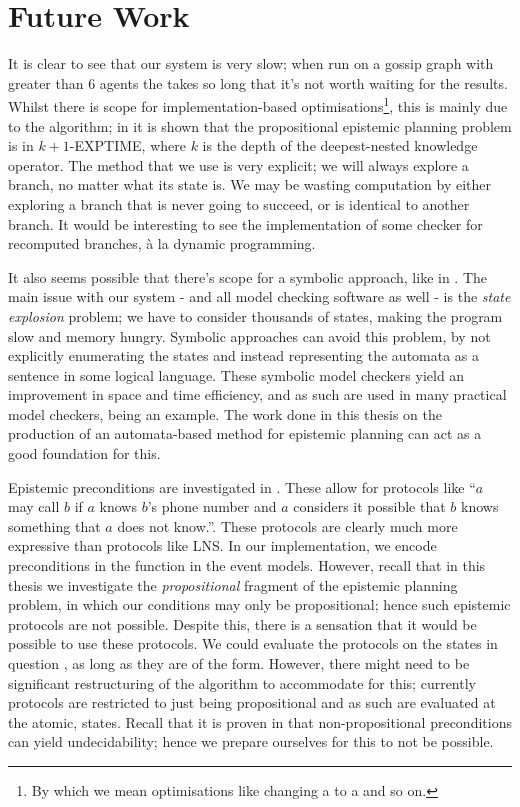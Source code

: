 \documentclass[10pt, a4paper]{report}
\begin{document}
\section{Future Work}

It is clear to see that our system is very slow; when run on a gossip graph with
greater than 6 agents the takes so long that it's not worth waiting for the
results. Whilst there is scope for implementation-based
optimisations\footnote{By which we mean optimisations like changing a 
  to a  and so on.}, this is mainly due to the algorithm; in
\cite{AutomataTechniques} it is shown that the propositional epistemic planning
problem is in \textsf{$k + 1$-EXPTIME}, where $k$ is the depth of the
deepest-nested knowledge operator. The method that we use is very explicit; we
will always explore a branch, no matter what its state is. We may be wasting
computation by either exploring a branch that is never going to succeed, or is
identical to another branch. It would be interesting to see the implementation
of some checker for recomputed branches, \`{a} la dynamic programming.

It also seems possible that there's scope for a symbolic approach, like in
\cite{MalvinThesis}. The main issue with our system - and all model checking
software as well - is the \emph{state explosion} problem; we have to consider
thousands of states, making the program slow and memory hungry. Symbolic
approaches can avoid this problem, by not explicitly enumerating the states and
instead representing the automata as a sentence in some logical language. These
symbolic model checkers yield an improvement in space and time efficiency, and
as such are used in many practical model checkers, \cite{SMCDEL} being an
example. The work done in this thesis on the production of an automata-based
method for epistemic planning can act as a good foundation for this.


Epistemic preconditions are investigated in \cite{EpProforDyGo}. These allow for
protocols like ``$a$ may call $b$ if $a$ knows $b$'s phone number and $a$
considers it possible that $b$ knows something that $a$ does not know.''. These
protocols are clearly much more expressive than protocols like \textsf{LNS}. In
our implementation, we encode preconditions in the \tpre function in the event
models. However, recall that in this thesis we investigate the
\emph{propositional} fragment of the epistemic planning problem, in which our
\tpre conditions may only be propositional; hence such epistemic protocols are
not possible. Despite this, there is a sensation that it would be possible to
use these protocols. We could evaluate the protocols on the states in question ,
as long as they are of the  form. However, there might need to be
significant restructuring of the algorithm to accommodate for this; currently
protocols are restricted to just being propositional and as such are evaluated
at the atomic,  states. Recall that it is proven in
\cite{UndecidabilityEP} that non-propositional preconditions can yield
undecidability; hence we prepare ourselves for this to not be possible.


\newpage

\printbibliography[title={Bibliography}]
\end{document}
